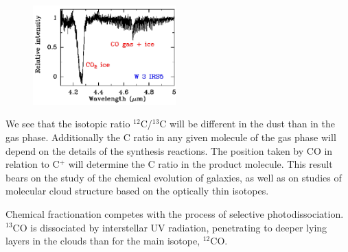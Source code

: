 \begin{frame}
\end{frame} \begin{frame}\frametitle{}

\begin{figure}
    \vspace{-0.5cm}
\includegraphics[width=0.49\textwidth,height=!]{./B/vandishoeck_fig4_straight.jpg}
\end{figure}  \vspace{0.1cm}  We see that the isotopic ratio
$^{12}$C/$^{13}$C will be different in the dust than in the gas phase.
Additionally the C ratio in any given molecule of the gas phase will
depend on the details of the synthesis reactions. The position taken
by CO in relation to C$^+$ will determine the C ratio in the product
molecule. This result bears on the study of the chemical evolution of
galaxies, as well as on studies of molecular cloud structure based on
the optically thin isotopes.

Chemical fractionation competes with the process of selective
photodissociation.  $^{13}$CO is dissociated by interstellar UV
radiation, penetrating to deeper lying layers in the clouds than for
the main isotope, $^{12}$CO.

\end{frame}



